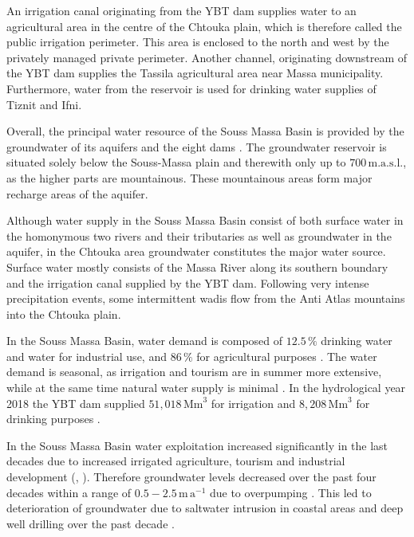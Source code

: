 An irrigation canal originating from the YBT dam supplies water to an agricultural area in the centre of the Chtouka plain, which is therefore called the public irrigation perimeter. 
This area is enclosed to the north and west by the privately managed private perimeter. 
Another channel, originating downstream of the YBT dam supplies the Tassila agricultural area near Massa municipality. 
Furthermore, water from the reservoir is used for drinking water supplies of Tiznit and Ifni.

Overall, the principal water resource of the Souss Massa Basin is provided by the groundwater of its aquifers and the eight dams \parencite{Hssaisoune.2017}. 
The groundwater reservoir is situated solely below the Souss-Massa plain and therewith only up to $700 \, \textrm{m.a.s.l.}$, as the higher parts are mountainous. 
These mountainous areas form major recharge areas of the aquifer.

Although water supply in the Souss Massa Basin consist of both surface water in the homonymous two rivers and their tributaries as well as groundwater in the aquifer, in the Chtouka area groundwater constitutes the major water source. 
Surface water mostly consists of the Massa River along its southern boundary and the irrigation canal supplied by the YBT dam. 
Following very intense precipitation events, some intermittent wadis flow from the Anti Atlas mountains into the Chtouka plain.

In the Souss Massa Basin, water demand is composed of $12.5 \, \%$ drinking water and water for industrial use, and $86 \, \%$ for agricultural purposes \parencite{Choukr.2017}. 
The water demand is seasonal, as irrigation and tourism are in summer more extensive, while at the same time natural water supply is minimal \parencite{Choukr.2017}.
In the hydrological year 2018 the YBT dam supplied $51,018 \, \textrm{Mm}^3$ for irrigation and $8,208 \, \textrm{Mm}^3$ for drinking purposes \parencite{ABHSMD-HydStats.2022}.

In the Souss Massa Basin water exploitation increased significantly in the last decades due to increased irrigated agriculture, tourism and industrial development (\textcite{Choukr.2017}, \textcite{Hssaisoune.2017}). 
Therefore groundwater levels decreased over the past four decades within a range of $0.5 - 2.5 \, \textrm{m}\, \textrm{a}^{-1}$ due to overpumping \parencite{Choukr.2017} \parencite{Hssaisoune.2017}. 
This led to deterioration of groundwater due to saltwater intrusion in coastal areas and deep well drilling over the past decade \parencite{Choukr.2017}.


